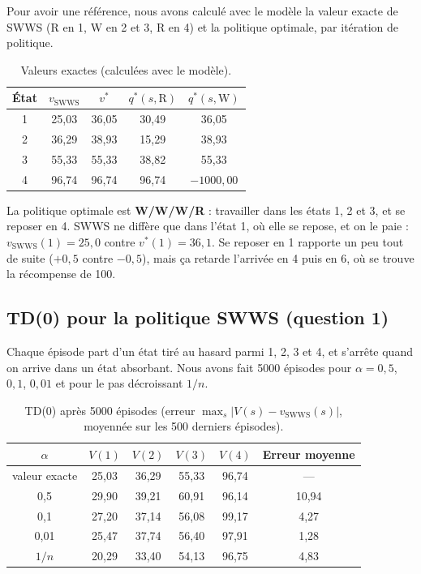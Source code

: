\documentclass[11pt,a4paper]{article}
\begin{document}
Pour avoir une référence, nous avons calculé avec le modèle la valeur exacte de SWWS (R en 1, W en 2 et 3, R en 4) et la politique optimale, par itération de politique.

\begin{table}[H]
  \centering
  \begin{tabular}{ccccc}
    \toprule
    État & $v_{\text{SWWS}}$ & $v^*$ & $q^*(s, \text{R})$ & $q^*(s, \text{W})$ \\
    \midrule
    1 & 25,03 & 36,05 & 30,49 & 36,05 \\
    2 & 36,29 & 38,93 & 15,29 & 38,93 \\
    3 & 55,33 & 55,33 & 38,82 & 55,33 \\
    4 & 96,74 & 96,74 & 96,74 & $-1000,00$ \\
    \bottomrule
  \end{tabular}
  \caption{Valeurs exactes (calculées avec le modèle).}
\end{table}

La politique optimale est \textbf{W/W/W/R} : travailler dans les états 1, 2 et 3, et se reposer en 4. SWWS ne diffère que dans l'état 1, où elle se repose, et on le paie : $v_{\text{SWWS}}(1) = 25,0$ contre $v^*(1) = 36,1$. Se reposer en 1 rapporte un peu tout de suite ($+0,5$ contre $-0,5$), mais ça retarde l'arrivée en 4 puis en 6, où se trouve la récompense de 100.

\subsection{TD(0) pour la politique SWWS (question 1)}

Chaque épisode part d'un état tiré au hasard parmi 1, 2, 3 et 4, et s'arrête quand on arrive dans un état absorbant. Nous avons fait 5000 épisodes pour $\alpha = 0,5$, $0,1$, $0,01$ et pour le pas décroissant $1/n$.

\begin{table}[H]
  \centering
  \begin{tabular}{cccccc}
    \toprule
    $\alpha$ & $V(1)$ & $V(2)$ & $V(3)$ & $V(4)$ & Erreur moyenne \\
    \midrule
    valeur exacte & 25,03 & 36,29 & 55,33 & 96,74 & --- \\
    0,5  & 29,90 & 39,21 & 60,91 & 96,14 & 10,94 \\
    0,1  & 27,20 & 37,14 & 56,08 & 99,17 & 4,27 \\
    0,01 & 25,47 & 37,74 & 56,40 & 97,91 & 1,28 \\
    $1/n$ & 20,29 & 33,40 & 54,13 & 96,75 & 4,83 \\
    \bottomrule
  \end{tabular}
  \caption{TD(0) après 5000 épisodes (erreur $\max_s |V(s) - v_{\text{SWWS}}(s)|$, moyennée sur les 500 derniers épisodes).}
\end{table}
\end{document}

